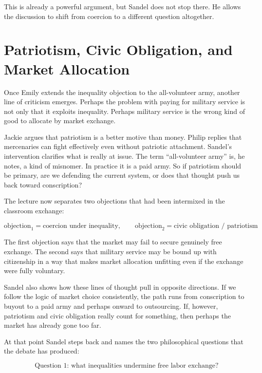 This is already a powerful argument, but Sandel does not stop there. He allows the discussion to shift from coercion to a different question altogether.

\section{Patriotism, Civic Obligation, and Market Allocation}

Once Emily extends the inequality objection to the all-volunteer army, another line of criticism emerges. Perhaps the problem with paying for military service is not only that it exploits inequality. Perhaps military service is the wrong kind of good to allocate by market exchange.

Jackie argues that patriotism is a better motive than money. Philip replies that mercenaries can fight effectively even without patriotic attachment. Sandel's intervention clarifies what is really at issue. The term ``all-volunteer army'' is, he notes, a kind of misnomer. In practice it is a paid army. So if patriotism should be primary, are we defending the current system, or does that thought push us back toward conscription?

The lecture now separates two objections that had been intermixed in the classroom exchange:

\begin{equation}
\text{objection}_1=\text{coercion under inequality},
\qquad
\text{objection}_2=\text{civic obligation / patriotism}
\end{equation}

The first objection says that the market may fail to secure genuinely free exchange. The second says that military service may be bound up with citizenship in a way that makes market allocation unfitting even if the exchange were fully voluntary.

Sandel also shows how these lines of thought pull in opposite directions. If we follow the logic of market choice consistently, the path runs from conscription to buyout to a paid army and perhaps onward to outsourcing. If, however, patriotism and civic obligation really count for something, then perhaps the market has already gone too far.

At that point Sandel steps back and names the two philosophical questions that the debate has produced:

\begin{equation}
\text{Question 1: what inequalities undermine free labor exchange?}
\end{equation}

